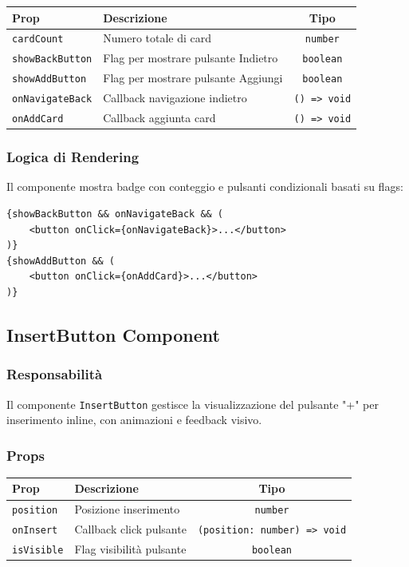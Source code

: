 \documentclass[11pt,a4paper]{article}
\begin{document}
\begin{tabularx}{\textwidth}{|l|X|c|}
\hline
\textbf{Prop} & \textbf{Descrizione} & \textbf{Tipo} \\
\hline
\texttt{cardCount} & Numero totale di card & \texttt{number} \\
\hline
\texttt{showBackButton} & Flag per mostrare pulsante Indietro & \texttt{boolean} \\
\hline
\texttt{showAddButton} & Flag per mostrare pulsante Aggiungi & \texttt{boolean} \\
\hline
\texttt{onNavigateBack} & Callback navigazione indietro & \texttt{() => void} \\
\hline
\texttt{onAddCard} & Callback aggiunta card & \texttt{() => void} \\
\hline
\end{tabularx}

\subsubsection{Logica di Rendering}

Il componente mostra badge con conteggio e pulsanti condizionali basati su flags:

\begin{lstlisting}[style=typescript, caption=Render Condizionale]
{showBackButton && onNavigateBack && (
    <button onClick={onNavigateBack}>...</button>
)}
{showAddButton && (
    <button onClick={onAddCard}>...</button>
)}
\end{lstlisting}

\subsection{InsertButton Component}

\subsubsection{Responsabilità}

Il componente \texttt{InsertButton} gestisce la visualizzazione del pulsante "+" per inserimento inline, con animazioni e feedback visivo.

\subsubsection{Props}

\begin{tabularx}{\textwidth}{|l|X|c|}
\hline
\textbf{Prop} & \textbf{Descrizione} & \textbf{Tipo} \\
\hline
\texttt{position} & Posizione inserimento & \texttt{number} \\
\hline
\texttt{onInsert} & Callback click pulsante & \texttt{(position: number) => void} \\
\hline
\texttt{isVisible} & Flag visibilità pulsante & \texttt{boolean} \\
\hline
\end{tabularx}
\end{document}
